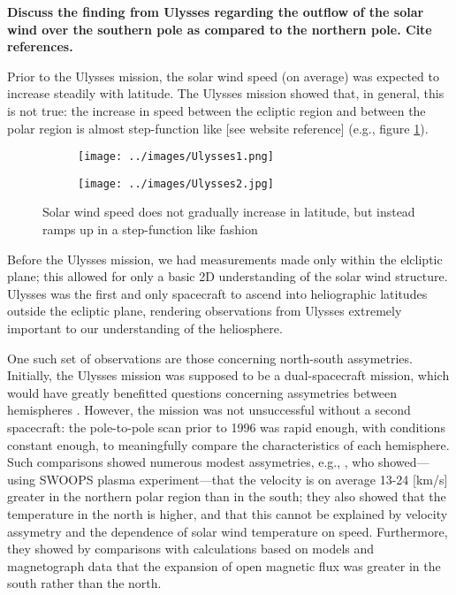 \textbf{Discuss the finding from Ulysses regarding the outflow of the solar wind over the southern pole as compared to the northern pole. Cite references.}

Prior to the Ulysses mission, the solar wind speed (on average) was
expected to increase steadily with latitude. The Ulysses mission showed
that, in general, this is not true: the increase in speed between the
ecliptic region and between the polar region is almost step-function
like [see \citet{Ulysses2009} website reference] (e.g., figure \ref{fig1}).

\begin{figure}[h]
  \centering
  \begin{subfigure}[1a]{0.3\textwidth}
    \centering
    \texttt{[image: ../images/Ulysses1.png]}
  \end{subfigure}
  \hfill
  \begin{subfigure}[1b]{0.6\textwidth}
    \centering
    \texttt{[image: ../images/Ulysses2.jpg]}
  \end{subfigure}
  \caption{Solar wind speed does not gradually increase in latitude, but instead ramps up in a step-function like fashion}
  \label{fig1}
\end{figure}

Before the Ulysses mission, we had measurements made only within the
elcliptic plane; this allowed for only a basic 2D understanding of the
solar wind structure. Ulysses was the first and only spacecraft to
ascend into heliographic latitudes outside the ecliptic plane, rendering
observations from Ulysses extremely important to our understanding of
the heliosphere.

One such set of observations are those concerning north-south
assymetries. Initially, the Ulysses mission was supposed to be a
dual-spacecraft mission, which would have greatly benefitted questions
concerning assymetries between hemispheres \citep{Marsden1996}. However, the
mission was not unsuccessful without a second spacecraft: the
pole-to-pole scan prior to 1996 was rapid enough, with conditions
constant enough, to meaningfully compare the characteristics of each
hemisphere. Such comparisons showed numerous modest assymetries,
e.g., \citet{Goldstein1996}, who showed---using SWOOPS plasma
experiment---that the velocity is on average 13-24 [km/s] greater in
the northern polar region than in the south; they also showed that the
temperature in the north is higher, and that this cannot be explained
by velocity assymetry and the dependence of solar wind temperature on
speed. Furthermore, they showed by comparisons with calculations based
on models and magnetograph data that the expansion of open magnetic
flux was greater in the south rather than the north.

